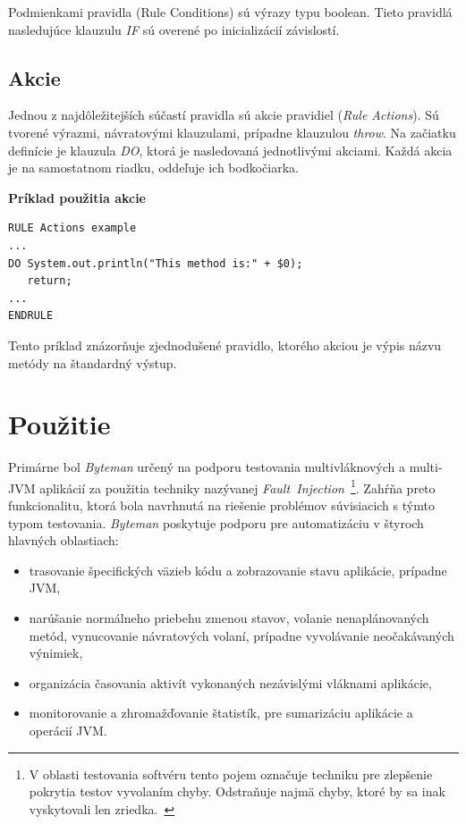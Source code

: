 \documentclass[11pt,final,oneside]{fithesis}
\newenvironment{example}[1]
{
\vspace{3mm}
\noindent\textbf{#1}
\vspace{2mm}
}
{
\vspace{3mm}
}
\begin{document}
Podmienkami pravidla (Rule Conditions) sú výrazy typu boolean. Tieto pravidlá 
nasledujúce klauzulu \textit{IF} sú overené po inicializácií závislostí.

\subsection{Akcie}
Jednou z najdôležitejších súčastí pravidla sú akcie pravidiel (\textit{Rule 
Actions}). Sú tvorené výrazmi, návratovými klauzulami, prípadne klauzulou
\textit{throw}. Na začiatku definície je klauzula \textit{DO}, ktorá je 
nasledovaná jednotlivými akciami. Každá akcia je na samostatnom riadku, 
oddeľuje ich bodkočiarka.

\begin{example}{Príklad použitia akcie}
\begin{verbatim}
RULE Actions example
...
DO System.out.println("This method is:" + $0);
   return;
...
ENDRULE
\end{verbatim}
\end{example}

Tento príklad znázorňuje zjednodušené pravidlo, ktorého akciou je výpis názvu 
metódy na štandardný výstup. 

\section{Použitie}
Primárne bol \textit{Byteman} určený na podporu testovania multivláknových a
multi-JVM aplikácií za použitia techniky nazývanej
\textit{Fault~Injection}~\footnote{V oblasti testovania softvéru tento pojem 
označuje techniku pre zlepšenie pokrytia testov vyvolaním chyby. Odstraňuje 
najmä chyby, ktoré by sa inak vyskytovali len
zriedka.~\cite{Roebuck:2011:STH:2031364}}. Zahŕňa preto 
funkcionalitu, ktorá bola navrhnutá na riešenie problémov súvisiacich s týmto 
typom testovania. \textit{Byteman} poskytuje podporu pre automatizáciu v 
štyroch hlavných 
oblastiach:

\begin{itemize}
\item trasovanie špecifických väzieb kódu a zobrazovanie stavu 
aplikácie, prípadne JVM,
\item narúšanie normálneho priebehu zmenou stavov, volanie nenaplánovaných
metód, vynucovanie návratových volaní, prípadne vyvolávanie neočakávaných 
výnimiek,
\item organizácia časovania aktivít vykonaných nezávislými vláknami aplikácie,
\item monitorovanie a zhromažďovanie štatistík, pre sumarizáciu aplikácie a
operácií JVM.
\end{itemize}
\end{document}
